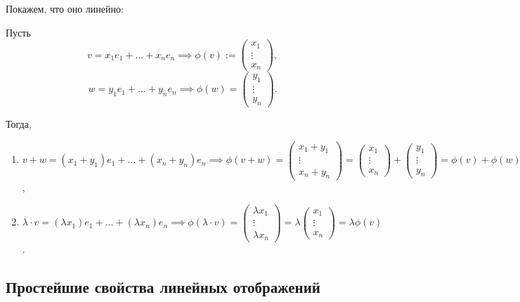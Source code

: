 Покажем, что оно линейно:

Пусть \begin{equation*}
    v = x_1 e_1 + \dots + x_n e_n \implies \phi(v) := \begin{pmatrix} x_1 \\ \vdots \\ x_n \end{pmatrix}
,\end{equation*} 
\begin{equation*}
    w = y_1 e_1 + \dots + y_n e_n \implies \phi(w) = \begin{pmatrix} y_1 \\ \vdots \\ y_n \end{pmatrix}
.\end{equation*}

Тогда,
\begin{enumerate}[label=\arabic*), nosep]
    \item \label{lec16:example5_1} $v + w = (x_1 + y_1) e_1 + \dots + (x_n + y_n) e_n \implies \phi(v + w) = \begin{pmatrix} x_1 + y_1 \\ \vdots \\ x_n + y_n \end{pmatrix} = \begin{pmatrix} x_1 \\ \vdots \\ x_n \end{pmatrix} + \begin{pmatrix} y_1 \\ \vdots \\ y_n \end{pmatrix} = \phi(v) + \phi(w)$,
    \item \label{lec16:example5_2} $\lambda \cdot v = (\lambda x_1) e_1 + \dots + (\lambda x_n) e_n \implies \phi(\lambda \cdot v) = \begin{pmatrix} \lambda x_1 \\ \vdots \\ \lambda x_n \end{pmatrix} = \lambda \begin{pmatrix} x_1 \\ \vdots \\ x_n \end{pmatrix} = \lambda \phi(v)$.
\end{enumerate}

\subsection{Простейшие свойства линейных отображений}

